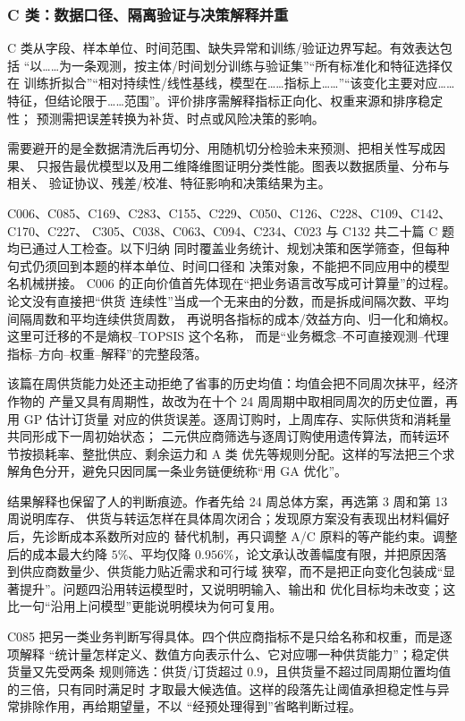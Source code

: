 \subsubsection{C 类：数据口径、隔离验证与决策解释并重}

C 类从字段、样本单位、时间范围、缺失异常和训练/验证边界写起。有效表达包括
“以……为一条观测，按主体/时间划分训练与验证集”“所有标准化和特征选择仅在
训练折拟合”“相对持续性/线性基线，模型在……指标上……”“该变化主要对应……
特征，但结论限于……范围”。评价排序需解释指标正向化、权重来源和排序稳定性；
预测需把误差转换为补货、时点或风险决策的影响。

需要避开的是全数据清洗后再切分、用随机切分检验未来预测、把相关性写成因果、
只报告最优模型以及用二维降维图证明分类性能。图表以数据质量、分布与相关、
验证协议、残差/校准、特征影响和决策结果为主。

C006、C085、C169、C283、C155、C229、C050、C126、C228、C109、C142、C170、C227、
C305、C038、C063、C094、C234、C023 与 C132 共二十篇 C 题均已通过人工检查。以下归纳
同时覆盖业务统计、规划决策和医学筛查，但每种句式仍须回到本题的样本单位、时间口径和
决策对象，不能把不同应用中的模型名机械拼接。
C006 的正向价值首先体现在“把业务语言改写成可计算量”的过程。论文没有直接把“供货
连续性”当成一个无来由的分数，而是拆成间隔次数、平均间隔周数和平均连续供货周数，
再说明各指标的成本/效益方向、归一化和熵权。这里可迁移的不是熵权--TOPSIS 这个名称，
而是“业务概念--不可直接观测--代理指标--方向--权重--解释”的完整段落。

该篇在周供货能力处还主动拒绝了省事的历史均值：均值会把不同周次抹平，经济作物的
产量又具有周期性，故改为在十个 24 周周期中取相同周次的历史位置，再用 GP 估计订货量
对应的供货误差。逐周订购时，上周库存、实际供货和消耗量共同形成下一周初始状态；
二元供应商筛选与逐周订购使用遗传算法，而转运环节按损耗率、整批供应、剩余运力和 A 类
优先等规则分配。这样的写法把三个求解角色分开，避免只因同属一条业务链便统称“用 GA
优化”。

结果解释也保留了人的判断痕迹。作者先给 24 周总体方案，再选第 3 周和第 13 周说明库存、
供货与转运怎样在具体周次闭合；发现原方案没有表现出材料偏好后，先诊断成本系数所对应的
替代机制，再只调整 A/C 原料的等产能约束。调整后的成本最大约降 $5\%$、平均仅降
$0.956\%$，论文承认改善幅度有限，并把原因落到供应商数量少、供货能力贴近需求和可行域
狭窄，而不是把正向变化包装成“显著提升”。问题四沿用转运模型时，又说明明输入、输出和
优化目标均未改变；这比一句“沿用上问模型”更能说明模块为何可复用。

C085 把另一类业务判断写得具体。四个供应商指标不是只给名称和权重，而是逐项解释
“统计量怎样定义、数值方向表示什么、它对应哪一种供货能力”；稳定供货量又先受两条
规则筛选：供货/订货超过 $0.9$，且供货量不超过同周期位置均值的三倍，只有同时满足时
才取最大候选值。这样的段落先让阈值承担稳定性与异常排除作用，再给期望量，不以
“经预处理得到”省略判断过程。

